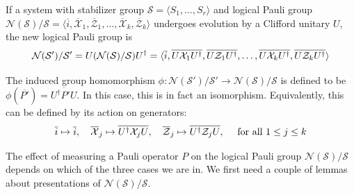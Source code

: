 \begin{theorem}\label{thm:logical_pauli_group_update_clifford}
    \cite[Procedure 6.3]{gottesman2024surviving} If a system with stabilizer group $\mathcal{S} = \langle S_1, \ldots, S_r \rangle$ and logical Pauli group $\mathcal{N}(\mathcal{S})/\mathcal{S} = \langle \overline{i}, \overline{\mathcal{X}}_1, \overline{\mathcal{Z}}_1, \ldots, \overline{\mathcal{X}}_k, \overline{\mathcal{Z}}_k \rangle$ undergoes evolution by a Clifford unitary $U$, the new logical Pauli group is
    \begin{equation}\label{eq:new_logical_Pauli_group}
        \mathcal{N}(\mathcal{S}')/\mathcal{S}' = U (\mathcal{N}(\mathcal{S})/\mathcal{S}) U^\dagger = \langle \overline{i}, \overline{U \mathcal{X}_1 U^\dagger}, \overline{U \mathcal{Z}_1 U^\dagger}, \ldots, \overline{U \mathcal{X}_k U^\dagger},  \overline{U \mathcal{Z}_k U^\dagger} \rangle
    \end{equation}

    The induced group homomorphism $\phi : \mathcal{N}(\mathcal{S}')/\mathcal{S}' \to \mathcal{N}(\mathcal{S})/\mathcal{S}$ is defined to be $\phi(\overline{P'}) = \overline{U^\dagger P' U}$.
    In this case, this is in fact an isomorphism.
    Equivalently, this can be defined by its action on generators:
    \begin{equation}
        \overline{i} \mapsto \overline{i}, \quad
        \overline{\mathcal{X}}_j \mapsto \overline{U^\dagger \mathcal{X}_j U}, \quad
        \overline{\mathcal{Z}}_j \mapsto \overline{U^\dagger \mathcal{Z}_j U}, \quad
        \text { for all $1 \leq j \leq k$}
    \end{equation}
\end{theorem}

The effect of measuring a Pauli operator $P$ on the logical Pauli group $\mathcal{N}(\mathcal{S})/\mathcal{S}$ depends on which of the three cases we are in.
We first need a couple of lemmas about presentations of $\mathcal{N}(\mathcal{S})/\mathcal{S}$.

